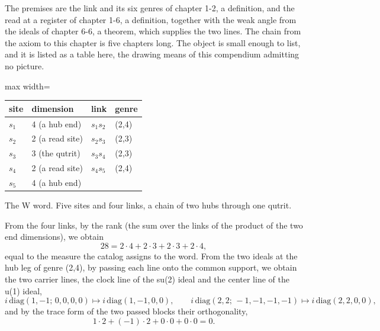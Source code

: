\begin{chproof}[exact]
The premises are the link and its six genres of chapter 1-2, a definition, and the read at a register of chapter 1-6, a definition, together with the weak angle from the ideals of chapter 6-6, a theorem, which supplies the two lines. The chain from the axiom to this chapter is five chapters long. The object is small enough to list, and it is listed as a table here, the drawing means of this compendium admitting no picture.
\begin{center}\small
\begin{adjustbox}{max width=\linewidth}\begin{tabular}{llll}
\hline
site & dimension & link & genre \\
\hline
$s_1$ & 4 (a hub end) & $s_1 s_2$ & (2,4) \\
$s_2$ & 2 (a read site) & $s_2 s_3$ & (2,3) \\
$s_3$ & 3 (the qutrit) & $s_3 s_4$ & (2,3) \\
$s_4$ & 2 (a read site) & $s_4 s_5$ & (2,4) \\
$s_5$ & 4 (a hub end) & & \\
\hline
\end{tabular}\end{adjustbox}

The W word. Five sites and four links, a chain of two hubs through one qutrit.
\end{center}
From the four links, by the rank (the sum over the links of the product of the two end dimensions), we obtain
\begin{equation}
28 = 2 \cdot 4 + 2 \cdot 3 + 2 \cdot 3 + 2 \cdot 4 ,
\end{equation}
equal to the measure the catalog assigns to the word. From the two ideals at the hub leg of genre (2,4), by passing each line onto the common support, we obtain the two carrier lines, the clock line of the su(2) ideal and the center line of the u(1) ideal,
\begin{equation}
i\,\mathrm{diag}(1,-1;\,0,0,0,0) \mapsto i\,\mathrm{diag}(1,-1,0,0), \qquad i\,\mathrm{diag}(2,2;\,-1,-1,-1,-1) \mapsto i\,\mathrm{diag}(2,2,0,0),
\end{equation}
and by the trace form of the two passed blocks their orthogonality,
\begin{equation}
1 \cdot 2 + (-1) \cdot 2 + 0 \cdot 0 + 0 \cdot 0 = 0 .
\end{equation}


\end{chproof}
